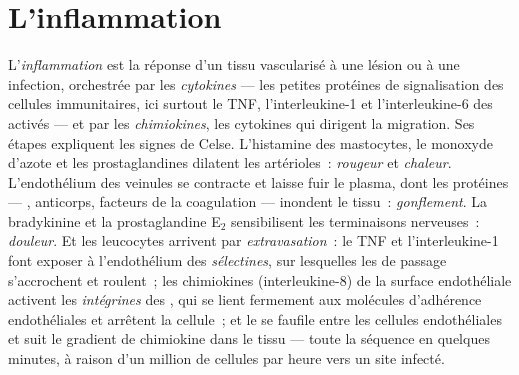 \section{L'inflammation}

\begin{definition}\label{def:b3:innate-immunity:inflammation}
L'\emph{inflammation} est la réponse d'un tissu vascularisé à une lésion
ou à une infection, orchestrée par les \emph{cytokines} --- les petites
protéines de signalisation des cellules immunitaires, ici surtout le
TNF, l'interleukine-1 et l'interleukine-6 des  activés --- et
par les \emph{chimiokines}, les cytokines qui dirigent la migration. Ses
étapes expliquent les signes de Celse. L'histamine des mastocytes, le
monoxyde d'azote et les prostaglandines dilatent les artérioles~:
\emph{rougeur} et \emph{chaleur}. L'endothélium des veinules se contracte
et laisse fuir le plasma, dont les protéines --- , anticorps,
facteurs de la coagulation --- inondent le tissu~: \emph{gonflement}. La
bradykinine et la prostaglandine E$_{2}$ sensibilisent les terminaisons
nerveuses~: \emph{douleur}. Et les leucocytes arrivent par
\emph{extravasation}~: le TNF et l'interleukine-1 font exposer à
l'endothélium des \emph{sélectines}, sur lesquelles les  de
passage s'accrochent et roulent~; les chimiokines (interleukine-8) de la
surface endothéliale activent les \emph{intégrines} des ,
qui se lient fermement aux molécules d'adhérence endothéliales et
arrêtent la cellule~; et le  se faufile entre les cellules
endothéliales et suit le gradient de chimiokine dans le tissu --- toute
la séquence en quelques minutes, à raison d'un million de cellules par
heure vers un site infecté.
\end{definition}

